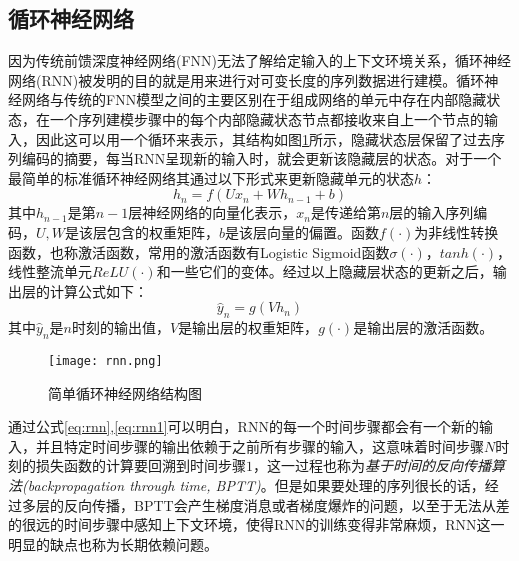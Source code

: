 
\subsection{循环神经网络}
因为传统前馈深度神经网络(FNN)无法了解给定输入的上下文环境关系，循环神经网络(RNN)被发明的目的就是用来进行对可变长度的序列数据进行建模。循环神经网络与传统的FNN模型之间的主要区别在于组成网络的单元中存在内部隐藏状态，在一个序列建模步骤中的每个内部隐藏状态节点都接收来自上一个节点的输入，因此这可以用一个循环来表示，其结构如图\ref{fig:rnn}所示，隐藏状态层保留了过去序列编码的摘要，每当RNN呈现新的输入时，就会更新该隐藏层的状态。对于一个最简单的标准循环神经网络其通过以下形式来更新隐藏单元的状态$h$：
\begin{equation}
  \label{eq:rnn}
  h_{n} = f \left(Ux_{n} + Wh_{n-1} + b \right)
\end{equation}
其中$h_{n-1}$是第$n-1$层神经网络的向量化表示，$x_{n}$是传递给第$n$层的输入序列编码，$U,W$是该层包含的权重矩阵，$b$是该层向量的偏置。函数$f(\cdot)$为非线性转换函数，也称激活函数，常用的激活函数有Logistic Sigmoid函数$\sigma(\cdot )$，$tanh(\cdot)$，线性整流单元$ReLU(\cdot)$和一些它们的变体。经过以上隐藏层状态的更新之后，输出层的计算公式如下：
\begin{equation}
  \label{eq:rnn1}
  \hat{y}_{n} = g(Vh_{n})
\end{equation}
其中$\hat{y}_{n}$是$n$时刻的输出值，$V$是输出层的权重矩阵，$g(\cdot)$是输出层的激活函数。
\begin{figure}[htb]%
  \centering
  \texttt{[image: rnn.png]}\\
  \caption{简单循环神经网络结构图}
  \label{fig:rnn}
\end{figure}
通过公式\ref{eq:rnn},\ref{eq:rnn1}可以明白，RNN的每一个时间步骤都会有一个新的输入，并且特定时间步骤的输出依赖于之前所有步骤的输入，这意味着时间步骤$N$时刻的损失函数的计算要回溯到时间步骤$1$，这一过程也称为\textit{基于时间的反向传播算法(backpropagation through time, BPTT)}。但是如果要处理的序列很长的话，经过多层的反向传播，BPTT会产生梯度消息或者梯度爆炸的问题，以至于无法从差的很远的时间步骤中感知上下文环境，使得RNN的训练变得非常麻烦，RNN这一明显的缺点也称为长期依赖问题。
